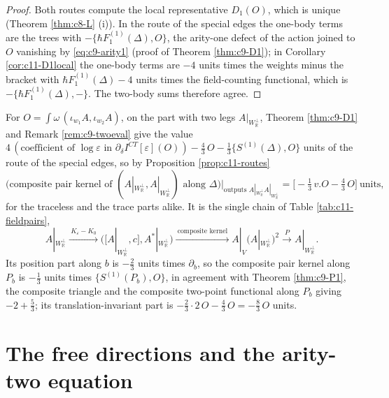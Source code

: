 \begin{proof}
Both routes compute the local representative $D_1(O)$, which is unique (Theorem \ref{thm:c8-L} (i)). In the route of the special edges the one-body terms are the trees with $-\{\hbar F_1^{(1)}(\Delta),O\}$, the arity-one defect of the action joined to $O$ vanishing by \eqref{eq:c9-arity1} (proof of Theorem \ref{thm:c9-D1}); in Corollary \ref{cor:c11-D1local} the one-body terms are $-4$ units times the weights minus the bracket with $\hbar F_1^{(1)}(\Delta)-4$ units times the field-counting functional, which is $-\{\hbar F_1^{(1)}(\Delta),-\}$. The two-body sums therefore agree.
\end{proof}

\begin{example}
\label{ex:c11-bilinear}
For $O=\int\omega\,(\iota_{w_1}A,\iota_{w_2}A)$, on the part with two legs $A|_{W_{\mathbb R}^\perp}$, Theorem \ref{thm:c9-D1} and Remark \ref{rem:c9-twoeval} give the value $4\,(\text{coefficient of }\log\varepsilon\text{ in }\partial_\delta I^{CT}[\varepsilon](O))-\tfrac43\,O-\tfrac13\{S^{(1)}(\Delta),O\}$ units of the route of the special edges, so by Proposition \ref{prop:c11-routes}
\[
\big(\text{composite pair kernel of }(A|_{W_{\mathbb R}^\perp},A|_{W_{\mathbb R}^\perp})\text{ along }\Delta\big)\Big|_{\text{outputs }A|_{W_{\mathbb R}^\perp}A|_{W_{\mathbb R}^\perp}}=\Big[-\tfrac13\,v.O-\tfrac43\,O\Big]\ \text{units},
\]
for the traceless and the trace parts alike. It is the single chain of Table \ref{tab:c11-fieldpairs},
\[
A|_{W_{\mathbb R}^\perp}\xrightarrow{\ K_\varepsilon-K_0\ }\big([A|_{W_{\mathbb R}^\perp},c],A^*|_{W_{\mathbb R}^\perp}\big)\xrightarrow{\ \text{composite kernel}\ }A|_V(A|_{W_{\mathbb R}^\perp})^2\xrightarrow{\ P\ }A|_{W_{\mathbb R}^\perp}.
\]
Its position part along $b$ is $-\tfrac23$ units times $\partial_b$, so the composite pair kernel along $P_b$ is $-\tfrac13$ units times $\{S^{(1)}(P_b),O\}$, in agreement with Theorem \ref{thm:c9-P1}, the composite triangle and the composite two-point functional along $P_b$ giving $-2+\tfrac53$; its translation-invariant part is $-\tfrac23\cdot2\,O-\tfrac43\,O=-\tfrac83\,O$ units.
\end{example}

\section{The free directions and the arity-two equation}

